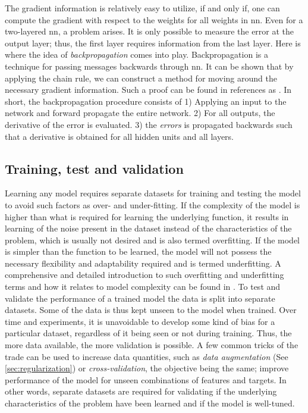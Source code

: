The gradient information is relatively easy to utilize, if and only if, one can compute the gradient with respect to the weights for all weights in \gls{nn}. Even for a two-layered \gls{nn}, a problem arises. It is only possible to measure the error at the output layer; thus, the first layer requires information from the last layer. Here is where the idea of \emph{backpropagation} comes into play. Backpropagation is a technique for passing messages backwards through \gls{nn}. It can be shown that by applying the chain rule, we can construct a method for moving around the necessary gradient information. Such a proof can be found in references as \cite{Nielsen2015, M.Bishop2006}. In short, the backpropagation procedure consists of 1) Applying an input to the network and forward propagate the entire network. 2) For all outputs, the derivative of the error is evaluated. 3) the \emph{errors} is propagated backwards such that a derivative is obtained for all hidden units and all layers. 
 



\subsection{Training, test and validation}
Learning any model requires separate datasets for training and testing the model to avoid such factors as over- and under-fitting. If the complexity of the model is higher than what is required for learning the underlying function, it results in learning of the noise present in the dataset instead of the characteristics of the problem, which is usually not desired and is also termed overfitting. If the model is simpler than the function to be learned, the model will not possess the necessary flexibility and adaptability required and is termed underfitting. A comprehensive and detailed introduction to such overfitting and underfitting terms and how it relates to model complexity can be found in \cite{M.Bishop2006}. To test and validate the performance of a trained model the data is split into separate datasets. Some of the data is thus kept unseen to the model when trained. Over time and experiments, it is unavoidable to develop some kind of bias for a particular dataset, regardless of it being seen or not during training. Thus, the more data available, the more validation is possible. A few common tricks of the trade can be used to increase data quantities, such as \emph{data augmentation} (See \ref{sec:regularization}) or \emph{cross-validation}, the objective being the same; improve performance of the model for unseen combinations of features and targets. In other words, separate datasets are required for validating if the underlying characteristics of the problem have been learned and if the model is well-tuned.

